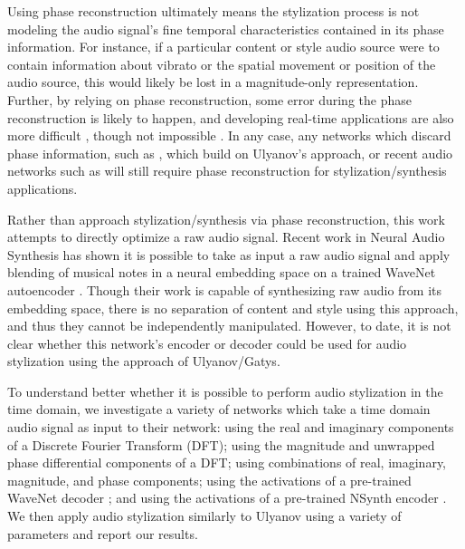 \documentclass{article}
\begin{document}
Using phase reconstruction ultimately means the stylization process is not modeling the audio signal's fine temporal characteristics contained in its phase information.  For instance, if a particular content or style audio source were to contain information about vibrato or the spatial movement or position of the audio source, this would likely be lost in a magnitude-only representation.  Further, by relying on phase reconstruction, some error during the phase reconstruction is likely to happen, and developing real-time applications are also more difficult \cite{Wyse2017}, though not impossible \cite{Prusa2017}.  In any case, any networks which discard phase information, such as \cite{Wyse2017}, which build on Ulyanov's approach, or recent audio networks such as \cite{Hershey2016} will still require phase reconstruction for stylization/synthesis applications.

Rather than approach stylization/synthesis via phase reconstruction, this work attempts to directly optimize a raw audio signal.  Recent work in Neural Audio Synthesis has shown it is possible to take as input a raw audio signal and apply blending of musical notes in a neural embedding space on a trained WaveNet autoencoder \cite{Engel2017}.  Though their work is capable of synthesizing raw audio from its embedding space, there is no separation of content and style using this approach, and thus they cannot be independently manipulated.  However, to date, it is not clear whether this network's encoder or decoder could be used for audio stylization using the approach of Ulyanov/Gatys.

To understand better whether it is possible to perform audio stylization in the time domain, we investigate a variety of networks which take a time domain audio signal as input to their network: using the real and imaginary components of a Discrete Fourier Transform (DFT); using the magnitude and unwrapped phase differential components of a DFT; using combinations of real, imaginary, magnitude, and phase components; using the activations of a pre-trained WaveNet decoder \cite{Oord2016b,Engel2017}; and using the activations of a pre-trained NSynth encoder \cite{Engel2017}.  We then apply audio stylization similarly to Ulyanov using a variety of parameters and report our results.

\end{document}
